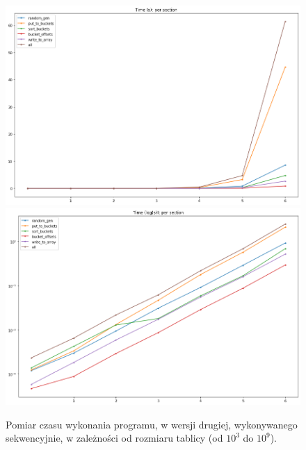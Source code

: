 \documentclass{article}
\begin{document}
        \begin{figure}[h!]
            \centering
            \includegraphics[width=17cm]{report2/images/Sequential/time.png}
            \includegraphics[width=17cm]{report2/images/Sequential/time_log.png}
            \caption{Pomiar czasu wykonania programu, w wersji drugiej, wykonywanego sekwencyjnie, w zależności od rozmiaru tablicy (od ${10^{3}}$ do ${10^{9}}$). }
        \end{figure}\\
    
    \FloatBarrier
    
\end{document}

